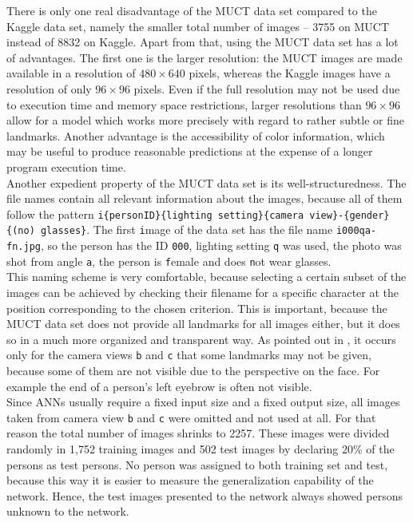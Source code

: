\documentclass[11pt, a4paper]{article}
\begin{document}
There is only one real disadvantage of the \ac{MUCT} data set compared to the Kaggle data set, namely the smaller total number of images -- 3755 on \ac{MUCT} instead of 8832 on Kaggle. Apart from that, using the \ac{MUCT} data set has a lot of advantages. The first one is the larger resolution: the \ac{MUCT} images are made available in a resolution of $480 \times 640$ pixels, whereas the Kaggle images have a resolution of only $96 \times 96$ pixels. Even if the full resolution may not be used due to execution time and memory space restrictions, larger resolutions than $96 \times 96$ allow for a model which works more precisely with regard to rather subtle or fine landmarks. Another advantage is the accessibility of color information, which may be useful to produce reasonable predictions at the expense of a longer program execution time.\\
Another expedient property of the \ac{MUCT} data set is its well-structuredness. The file names contain all relevant information about the images, because all of them follow the pattern \texttt{i\{personID\}\{lighting setting\}\{camera view\}-\{gender\}\{(no) glasses\}}. The first \texttt{i}mage of the data set has the file name \texttt{i000qa-fn.jpg}, so the person has the ID \texttt{000}, lighting setting \texttt{q} was used, the photo was shot from angle \texttt{a}, the person is \texttt{f}emale and does \texttt{n}ot wear glasses.\\
This naming scheme is very comfortable, because selecting a certain subset of the images can be achieved by checking their filename for a specific character at the position corresponding to the chosen criterion. This is important, because the \ac{MUCT} data set does not provide all landmarks for all images either, but it does so in a much more organized and transparent way. As pointed out in \cite{muct}, it occurs only for the camera views \texttt{b} and \texttt{c} that some landmarks may not be given, because some of them are not visible due to the perspective on the face. For example the end of a person's left eyebrow is often not visible.\\
Since \acp{ANN} usually require a fixed input size and a fixed output size, all images taken from camera view \texttt{b} and \texttt{c} were omitted and not used at all. For that reason the total number of images shrinks to 2257. These images were divided randomly in 1,752 training images and 502 test images by declaring 20\% of the persons as test persons. No person was assigned to both training set and test, because this way it is easier to measure the generalization capability of the network. Hence, the test images presented to the network always showed persons unknown to the network.
\end{document}
